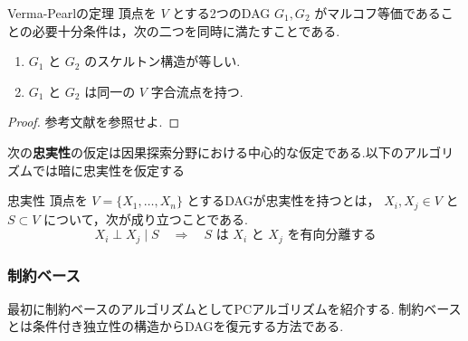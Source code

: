 \documentclass[uplatex, dvipdfmx]{jsarticle}
\begin{document}
\begin{thm}{Verma-Pearlの定理}
  頂点を $V$ とする2つのDAG $G_1,G_2$ がマルコフ等価であることの必要十分条件は，次の二つを同時に満たすことである.
  \begin{enumerate}
    \item
      $G_1$ と $G_2$ のスケルトン構造が等しい.

    \item
      $G_1$ と $G_2$ は同一の $V$ 字合流点を持つ.
  \end{enumerate}
\end{thm}
\begin{proof}
  参考文献\cite{verma1990}を参照せよ.
\end{proof}

次の\textbf{忠実性}の仮定は因果探索分野における中心的な仮定である.以下のアルゴリズムでは暗に忠実性を仮定する

\begin{defn}{忠実性}
  頂点を $V=\{X_1,\ldots,X_n\}$ とするDAGが忠実性を持つとは，
  $X_i,X_j\in V$ と $S\subset V$ について，次が成り立つことである.
  \[
    X_i\perp X_j\mid S
    \quad\Rightarrow\quad
    S\text{ は }X_i\text{ と }X_j\text{ を有向分離する}
  \]
\end{defn}

\subsubsection*{制約ベース}
最初に制約ベースのアルゴリズムとしてPCアルゴリズムを紹介する.
制約ベースとは条件付き独立性の構造からDAGを復元する方法である.
\end{document}
